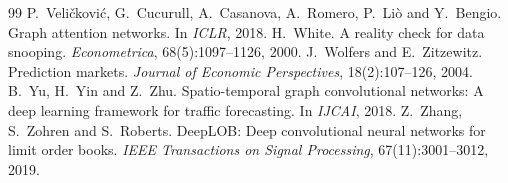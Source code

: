 \documentclass[11pt,a4paper]{article}
\begin{document}
{\begin{thebibliography}{99}
 P.~Veli\v{c}kovi\'c, G.~Cucurull, A.~Casanova, A.~Romero, P.~Li\`o and Y.~Bengio. Graph attention networks. In \emph{ICLR}, 2018.
 H.~White. A reality check for data snooping. \emph{Econometrica}, 68(5):1097--1126, 2000.
 J.~Wolfers and E.~Zitzewitz. Prediction markets. \emph{Journal of Economic Perspectives}, 18(2):107--126, 2004.
 B.~Yu, H.~Yin and Z.~Zhu. Spatio-temporal graph convolutional networks: A deep learning framework for traffic forecasting. In \emph{IJCAI}, 2018.
 Z.~Zhang, S.~Zohren and S.~Roberts. DeepLOB: Deep convolutional neural networks for limit order books. \emph{IEEE Transactions on Signal Processing}, 67(11):3001--3012, 2019.
\end{thebibliography}
}
\end{document}
